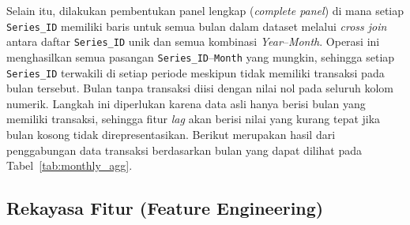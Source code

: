 Selain itu, dilakukan pembentukan panel lengkap (\textit{complete panel}) di mana setiap \texttt{Series\_ID} memiliki baris untuk semua bulan dalam dataset melalui \textit{cross join} antara daftar \texttt{Series\_ID} unik dan semua kombinasi \textit{Year}--\textit{Month}. Operasi ini menghasilkan semua pasangan \texttt{Series\_ID}--\texttt{Month} yang mungkin, sehingga setiap \texttt{Series\_ID} terwakili di setiap periode meskipun tidak memiliki transaksi pada bulan tersebut. Bulan tanpa transaksi diisi dengan nilai nol pada seluruh kolom numerik. Langkah ini diperlukan karena data asli hanya berisi bulan yang memiliki transaksi, sehingga fitur \textit{lag} akan berisi nilai yang kurang tepat jika bulan kosong tidak direpresentasikan. Berikut merupakan hasil dari penggabungan data transaksi berdasarkan bulan yang dapat dilihat pada Tabel~\ref{tab:monthly_agg}.
\begin{table}[H]
\centering
\caption{Preview Data Agregasi Bulanan}
\label{tab:monthly_agg}
\end{table}

\subsection{Rekayasa Fitur (Feature Engineering)}


